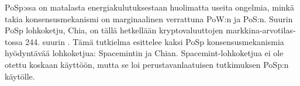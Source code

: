 \begin{otherlanguage}{english}
PoSp:ssa on matalasta energiakulutuksestaan huolimatta useita ongelmia, minkä takia konsensusmekanismi on marginaalinen verrattuna PoW:n ja PoS:n. Suurin PoSp lohkoketju, Chia, on tällä hetkellään kryptovaluuttojen markkina-arvotilastossa 244. suurin \cite{Coingecko}. Tämä tutkielma esittelee kaksi PoSp konsensusmekanismia hyödyntävää lohkoketjua: Spacemintin ja Chian. Spacemint-lohkoketjua ei ole otettu koskaan käyttöön, mutta se loi perustavanlaatuisen tutkimuksen PoSp:n käytölle.





\end{otherlanguage}